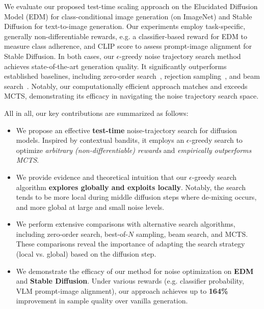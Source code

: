 \documentclass{article}
\begin{document}
We evaluate our proposed test-time scaling approach on the Elucidated Diffusion Model (EDM) \citep{karras2022elucidatingdesignspacediffusionbased} for class-conditional image generation (on ImageNet) and Stable Diffusion \citep{rombach2022highresolutionimagesynthesislatent} for text-to-image generation. Our experiments employ task-specific, generally non-differentiable rewards, e.g. a classifier-based reward for EDM to measure class adherence, and CLIP score to assess prompt-image alignment for Stable Diffusion. In both cases, our $\epsilon$-greedy noise trajectory search method achieves state-of-the-art generation quality. It significantly outperforms established baselines, including zero-order search~\citep{ma2025inferencetimescalingdiffusionmodels}, rejection sampling~\citep{chatterjee2017samplesizerequiredimportance}, and beam search~\citep{fernandes2025latentbeamdiffusionmodels}. Notably, our computationally efficient approach matches and exceeds MCTS, demonstrating its efficacy in navigating the noise trajectory search space.


All in all, our key contributions are summarized as follows:
%
\begin{itemize}
    \item We propose an effective \textbf{test-time} noise-trajectory search for diffusion models. Inspired by contextual bandits, it employs an $\epsilon$-greedy search to optimize \textit{arbitrary (non-differentiable) rewards} and \textit{empirically outperforms MCTS}.

    \item We provide evidence and theoretical intuition that our $\epsilon$-greedy search algorithm \textbf{explores globally and exploits locally}. Notably, the search tends to be more local during middle diffusion steps where de-mixing occurs, and more global at large and small noise levels.

    \item We perform extensive comparisons with alternative search algorithms, including zero-order search, best-of-$N$ sampling, beam search, and MCTS. These comparisons reveal the importance of adapting the search strategy (local vs. global) based on the diffusion step.

    \item We demonstrate the efficacy of our method for noise optimization on \textbf{EDM} and \textbf{Stable Diffusion}. Under various rewards (e.g. classifier probability, VLM prompt-image alignment), our approach achieves up to \textbf{164\%} improvement in sample quality over vanilla generation.
\end{itemize}
\end{document}

